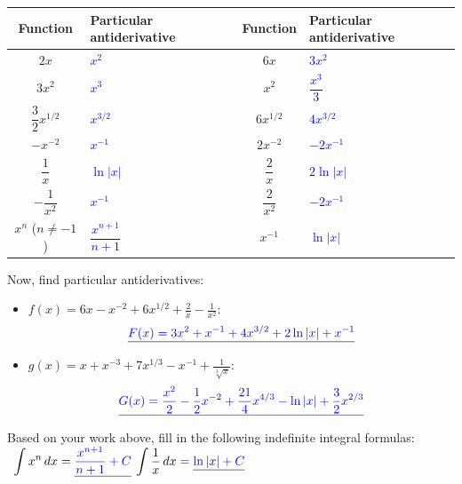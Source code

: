 \documentclass[10pt]{article}
\begin{document}
\begin{center}
\begin{tabular}{ | c | m{2.5in} || c | m{2.5in} | }
\hline
\textbf{Function} & \textbf{Particular antiderivative} & \textbf{Function} & \textbf{Particular antiderivative}\\
\hline
$2x$ & \textcolor{blue}{$x^2$} & $6x$ & \textcolor{blue}{$3x^2$} \\
\hline
$3x^2$ & \textcolor{blue}{$x^3$} & $x^2$ & \textcolor{blue}{$\dfrac{x^3}{3}$} \\
\hline
$\dfrac{3}{2}x^{1/2}$ & \textcolor{blue}{$x^{3/2}$} & $6x^{1/2}$ & \textcolor{blue}{$4x^{3/2}$} \\
\hline
$-x^{-2}$ & \textcolor{blue}{$x^{-1}$} & $2x^{-2}$ & \textcolor{blue}{$-2x^{-1}$} \\
\hline
$\dfrac{1}{x}$ & \textcolor{blue}{$\ln|x|$} & $\dfrac{2}{x}$ & \textcolor{blue}{$2\ln|x|$} \\
\hline
$-\dfrac{1}{x^2}$ & \textcolor{blue}{$x^{-1}$} & $\dfrac{2}{x^2}$ & \textcolor{blue}{$-2x^{-1}$} \\
\hline
$x^n$ ($n \neq -1$) & \textcolor{blue}{$\dfrac{x^{n+1}}{n+1}$} & $x^{-1}$ & \textcolor{blue}{$\ln|x|$} \\
\hline
\end{tabular}
\end{center}

Now, find particular antiderivatives:

\begin{itemize}
\item $f(x)=6x-x^{-2}+6x^{1/2}+\frac2x-\frac1{x^2}$: 
\[\underline{\textcolor{blue}{F(x) = 3x^2 + x^{-1} + 4x^{3/2} + 2\ln|x| + x^{-1}}}\]
\item $g(x)=x + x^{-3} + 7x^{1/3} - x^{-1} + \frac{1}{\sqrt[3]{x}}$: 
\[\textcolor{blue}{\underline{G(x) = \frac{x^2}{2} - \frac{1}{2} x^{-2} + \frac{21}{4}x^{4/3} - \ln|x| + \frac{3}{2}x^{2/3}}}\]
\end{itemize}

Based on your work above, fill in the following indefinite integral formulas:\\

\,\hfill
$\displaystyle\int x^n\,dx = \underline{\textcolor{blue}{\frac{x^{n+1}}{n+1} + C}}$
\hfill
$\displaystyle\int \frac1x\,dx = \underline{\textcolor{blue}{\ln|x| + C}}$
\hfill\,

\

\newpage

\begin{center}
\end{center}
\end{document}
